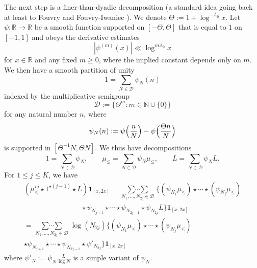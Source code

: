 \documentclass[12pt,a4paper,reqno]{amsart}
\numberwithin{equation}{section}
\theoremstyle{plain}
\theoremstyle{definition}
\newcommand\R{\mathbb{R}}
\newcommand\N{\mathbb{N}}
\newcommand\multsum{\mathop{\sum\cdots\sum}\limits}
\newcommand{\onef}{\mathbf{1}}
\begin{document}
The next step is a finer-than-dyadic decomposition (a standard idea
going back at least to Fouvry \cite{fouvry} and Fouvry-Iwaniec
\cite{fi-2}).  We denote $\Theta:=1+\log^{-A_0}x$.  Let $\psi \colon
\R \to \R$ be a smooth function supported on $[-\Theta,\Theta]$ that
is equal to $1$ on $[-1,1]$
and obeys the derivative estimates
$$ |\psi^{(m)}(x)| \ll \log^{mA_0} x$$
for $x\in\R$ and any fixed $m \geq 0$, where the implied constant
depends only on $m$.  We then have a smooth partition of unity
$$ 1 = \sum_{N \in {\mathcal D}} \psi_N(n)$$
indexed by the multiplicative semigroup 
$$ {\mathcal D} := \{ \Theta^m\colon  m \in \N \cup \{0\} \}$$
for any natural number $n$, where
$$ \psi_N(n) := \psi\Bigl( \frac{n}{N}\Bigr) - \psi\Bigl( \frac{\Theta
  n}{N}\Bigr)
$$ 
is supported in $[\Theta^{-1}N,\Theta N]$.  We thus have decompositions
$$
1 = \sum_{N \in {\mathcal D}} \psi_N,\quad\quad \mu_{\leq} = \sum_{N
  \in {\mathcal D}} \psi_N \mu_{\leq}, \quad\quad L = \sum_{N \in
  {\mathcal D}} \psi_N L.
$$
For $1 \leq j \leq K$, we have
\begin{multline*}
  (\mu_{\leq}^{\star j} \star 1^{\star (j-1)} \star L) \onef_{[x,2x]}
  = \multsum_{N_1,\ldots,N_{2j} \in {\mathcal D}} \{(\psi_{N_1} \mu_{\leq}
  ) \star \cdots \star (\psi_{N_j} \mu_{\leq} ) \\
\quad\quad\quad\quad\quad\quad\quad\quad
  \star \psi_{N_{j+1}} \star \cdots \star \psi_{N_{2j-1}} \star
  \psi_{N_{2j}} L\} \onef_{[x,2x]}
\\   =\multsum_{N_1,\ldots,N_{2j} \in {\mathcal D}} \log(N_{2j})
  \{(\psi_{N_1} \mu_{\leq}) \star \cdots \star (\psi_{N_j} \mu_{\leq})\\
  \star \psi_{N_{j+1}} \star \cdots \star \psi_{N_{2j-1}} \star
  \psi'_{N_{2j}}\} \onef_{[x,2x]}
\end{multline*}
where $\psi'_N := \psi_N \frac{L}{\log N}$ is a simple variant of
$\psi_N$.
\end{document}
